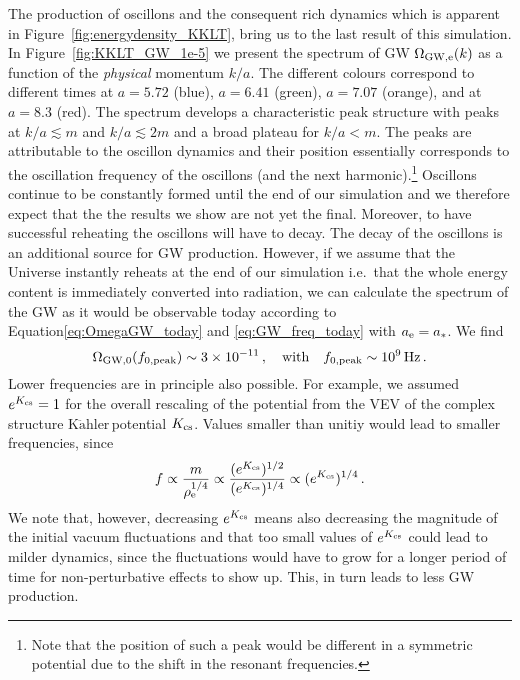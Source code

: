 \documentclass[12pt]{article}
\newcommand{\be}{\begin{equation}}
\newcommand{\ee}{\end{equation}}
\newcommand{\Kahler}{\ensuremath{\text{K}\ddot{\text{a}}\text{hler}\,}}
\begin{document}
The production of oscillons and the consequent rich dynamics which is apparent in Figure~\ref{fig:energydensity_KKLT}, bring us to the last result of this simulation. In Figure~\ref{fig:KKLT_GW_1e-5} we present the spectrum of GW $\Omega_{\rm GW, \rm e}(k)$ as a function of the \textit{physical} momentum $k/a$. The different colours correspond to different times at $a=5.72$ (blue), $a=6.41$ (green), $a=7.07$ (orange), and at $a=8.3$ (red). The spectrum develops a characteristic peak structure with peaks at $k/a\lesssim m$ and $k/a\lesssim 2m$ and a broad plateau for $k/a<m$. The peaks are attributable to the oscillon dynamics and their position essentially corresponds to the oscillation frequency of the oscillons (and the next harmonic).\footnote{Note that the position of such a peak would be different in a symmetric potential due to the shift in the resonant frequencies.} Oscillons continue to be constantly formed until the end of our simulation and we therefore expect that the the results we show are not yet the final. Moreover, to have successful reheating the oscillons will have to decay. The decay of the oscillons is an additional source for GW production. However, if we assume that the Universe instantly reheats at the end of our simulation i.e.\ that the whole energy content is immediately converted into radiation, we can calculate the spectrum of the GW as it would be observable today according to Equation\eqref{eq:OmegaGW_today} and \eqref{eq:GW_freq_today} with $a_{\rm e}=a_*$. We find 
\be
\Omega_{\rm GW,0}(f_{0, \rm peak}) \sim3\times10^{-11} \,,\quad \textrm{with} \quad f_{0, \rm peak}\sim 10^9\,\textrm{Hz}\,.
\ee
Lower frequencies are in principle also possible. For example, we assumed $e^{K_{\rm cs}}=1$ for the overall rescaling of the potential from the VEV of the complex structure \Kahler potential $K_{\rm cs}$. Values smaller than unitiy would lead to smaller frequencies, since 
\be
f \propto \frac{m}{\rho^{1/4}_{\rm e}} \propto \frac{(e^{K_{\rm cs}})^{1/2}}{(e^{K_{\rm cs}})^{1/4}}\propto (e^{K_{\rm cs}})^{1/4}\,.
\ee
We note that, however, decreasing $e^{K_{\rm cs}}$ means also decreasing the magnitude of the initial vacuum fluctuations and that too small values of $e^{K_{\rm cs}}$ could lead to milder dynamics, since the fluctuations would have to grow for a longer period of time for non-perturbative effects to show up. This, in turn leads to less GW production.
\end{document}
